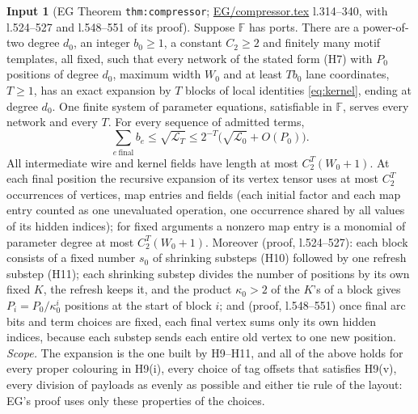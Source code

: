 \documentclass[11pt]{article}
\theoremstyle{definition}
\newtheorem{hyp}{Input}
\theoremstyle{remark}
\newcommand{\F}{\mathbb F}
\newcommand{\LL}{\mathcal L}
\newcommand{\src}[1]{\url{#1}}
\begin{document}
\begin{hyp}[EG Theorem \texttt{thm:compressor}; \src{EG/compressor.tex} l.314--340, with l.524--527 and l.548--551 of its proof]\label{H8}
Suppose $\F$ has ports. There are a power-of-two degree $d_0$, an integer $b_0\ge1$, a constant $C_2\ge2$ and finitely many motif
templates, all fixed, such that every network of the stated form (H7) with $P_0$ positions of degree $d_0$, maximum width $W_0$
and at least $Tb_0$ lane coordinates, $T\ge1$, has an exact expansion by $T$ blocks of local identities \eqref{eq:kernel},
ending at degree $d_0$. One finite system of parameter equations, satisfiable in $\F$, serves every network and every $T$. For
every sequence of admitted terms,
\begin{equation}\label{eq:compress}
 \textstyle\sum_{e\ \mathrm{final}}b_e\le\sqrt{\LL_T}\le2^{-T}\bigl(\sqrt{\LL_0}+O(P_0)\bigr).
\end{equation}
All intermediate wire and kernel fields have length at most $C_2^T(W_0+1)$. At each final position the recursive expansion of
its vertex tensor uses at most $C_2^T$ occurrences of vertices, map entries and fields (each initial factor and each map entry
counted as one unevaluated operation, one occurrence shared by all values of its hidden indices); for fixed arguments a nonzero
map entry is a monomial of parameter degree at most $C_2^T(W_0+1)$. Moreover (proof, l.524--527): each block consists of a fixed
number $s_0$ of shrinking substeps (H10) followed by one refresh substep (H11); each shrinking substep divides the number of
positions by its own fixed $K$, the refresh keeps it, and the product $\kappa_0>2$ of the $K$'s of a block gives
$P_i=P_0/\kappa_0^{i}$ positions at the start of block $i$; and (proof, l.548--551) once final arc bits and term choices are fixed,
each final vertex sums only its own hidden indices, because each substep sends each entire old vertex to one new position.
\emph{Scope.} The expansion is the one built by H9--H11, and all of the above holds for every proper colouring in H9(i), every
choice of tag offsets that satisfies H9(v), every division of payloads as evenly as possible and either tie rule of the layout:
EG's proof uses only these properties of the choices.
\end{hyp}
\end{document}
